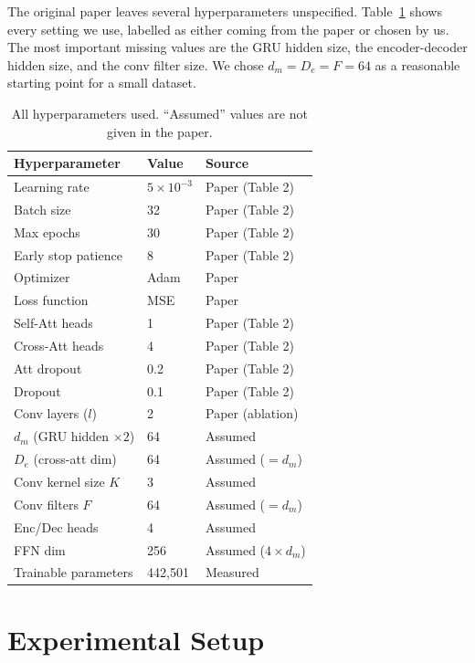 \documentclass[11pt,twocolumn]{article}
\begin{document}
The original paper leaves several hyperparameters unspecified. Table~\ref{tab:hparam} shows every setting we use, labelled as either coming from the paper or chosen by us. The most important missing values are the GRU hidden size, the encoder-decoder hidden size, and the conv filter size. We chose $d_m = D_e = F = 64$ as a reasonable starting point for a small dataset.

\begin{table}[t]
\centering
\small
\begin{tabular}{lll}
\toprule
\textbf{Hyperparameter} & \textbf{Value} & \textbf{Source} \\
\midrule
Learning rate & $5 \times 10^{-3}$ & Paper (Table 2) \\
Batch size & 32 & Paper (Table 2) \\
Max epochs & 30 & Paper (Table 2) \\
Early stop patience & 8 & Paper (Table 2) \\
Optimizer & Adam & Paper \\
Loss function & MSE & Paper \\
Self-Att heads & 1 & Paper (Table 2) \\
Cross-Att heads & 4 & Paper (Table 2) \\
Att dropout & 0.2 & Paper (Table 2) \\
Dropout & 0.1 & Paper (Table 2) \\
Conv layers ($l$) & 2 & Paper (ablation) \\
\midrule
$d_m$ (GRU hidden $\times 2$) & 64 & Assumed \\
$D_e$ (cross-att dim) & 64 & Assumed ($= d_m$) \\
Conv kernel size $K$ & 3 & Assumed \\
Conv filters $F$ & 64 & Assumed ($= d_m$) \\
Enc/Dec heads & 4 & Assumed \\
FFN dim & 256 & Assumed ($4 \times d_m$) \\
\midrule
Trainable parameters & 442,501 & Measured \\
\bottomrule
\end{tabular}
\caption{All hyperparameters used. ``Assumed'' values are not given in the paper.}
\label{tab:hparam}
\end{table}

\section{Experimental Setup}
\label{sec:experiments}
\end{document}
